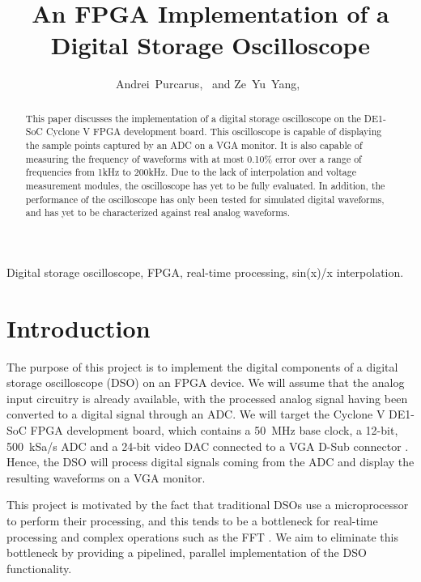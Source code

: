 \documentclass[journal]{IEEEtran}
\title{An FPGA Implementation of a \\ Digital Storage Oscilloscope}
\author{Andrei~Purcarus,~\IEEEmembership{McGill~University} and Ze~Yu~Yang,~\IEEEmembership{McGill~University}}
\begin{document}
\sloppy

\maketitle

\begin{abstract}

This paper discusses the implementation of a digital storage oscilloscope on the DE1-SoC Cyclone V FPGA development board. This oscilloscope is capable of displaying the sample points captured by an ADC on a VGA monitor. It is also capable of measuring the frequency of waveforms with at most 0.10\% error over a range of frequencies from 1kHz to 200kHz. Due to the lack of interpolation and voltage measurement modules, the oscilloscope has yet to be fully evaluated. In addition, the performance of the oscilloscope has only been tested for simulated digital waveforms, and has yet to be characterized against real analog waveforms.

\end{abstract}

\begin{IEEEkeywords}

Digital storage oscilloscope, FPGA, real-time processing, sin(x)/x interpolation.

\end{IEEEkeywords}

\section{Introduction}

The purpose of this project is to implement the digital components of a digital storage oscilloscope (DSO) on an FPGA device. We will assume that the analog input circuitry is already available, with the processed analog signal having been converted to a digital signal through an ADC. We will target the Cyclone V DE1-SoC FPGA development board, which contains a 50~MHz base clock, a 12-bit, 500~kSa/s ADC and a 24-bit video DAC connected to a VGA D-Sub connector \cite{DE1SoC,ltc2308}. Hence, the DSO will process digital signals coming from the ADC and display the resulting waveforms on a VGA monitor.

This project is motivated by the fact that traditional DSOs use a microprocessor to perform their processing, and this tends to be a bottleneck for real-time processing and complex operations such as the FFT \cite{tektronix_xyz_2016}. We aim to eliminate this bottleneck by providing a pipelined, parallel implementation of the DSO functionality.
\end{document}
